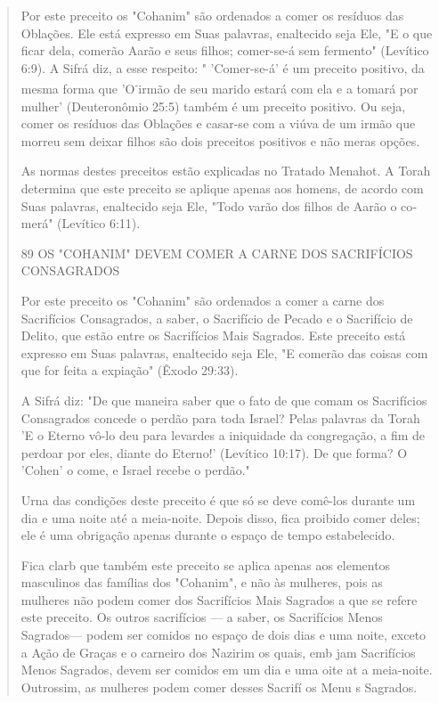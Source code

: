 \begin{quote}
Por este preceito os "Cohanim" são ordenados a comer os resíduos das
Oblações. Ele está expresso em Suas palavras, enaltecido seja Ele, "E o
que ficar dela, comerão Aarão e seus filhos; comer-se-á sem fermento"
(Levítico 6:9). A Sifrá diz, a esse respeito: " 'Comer-se-á' é um
preceito positivo, da mesma forma que 'O\textsuperscript{-}irmão de seu
marido estará com ela e a tomará por mulher' (Deu­teronômio 25:5) também
é um preceito positivo. Ou seja, comer os resíduos das Oblações e
casar-se com a viúva de um irmão que morreu sem deixar filhos são dois
preceitos positivos e não meras opções.

As normas destes preceitos estão explicadas no Tratado Menahot. A Torah
determina que este preceito se aplique apenas aos homens, de acordo com
Suas palavras, enaltecido seja Ele, "Todo varão dos filhos de Aarão o
co­merá" (Levítico 6:11).

89 OS "COHANIM" DEVEM COMER A CARNE DOS SACRIFÍCIOS CONSAGRADOS

Por este preceito os "Cohanim" são ordenados a comer a carne dos
Sacrifícios Consagrados, a saber, o Sacrifício de Pecado e o Sacrifício
de Delito, que estão entre os Sacrifícios Mais Sagrados. Este preceito
está expresso em Suas palavras, enaltecido seja Ele, "E comerão das
coisas com que for feita a expia­ção" (Êxodo 29:33).

A Sifrá diz: "De que maneira saber que o fato de que comam os
Sa­crifícios Consagrados concede o perdão para toda Israel? Pelas
palavras da To­rah 'E o Eterno vô-lo deu para levardes a iniquidade da
congregação, a fim de perdoar por eles, diante do Eterno!' (Levítico
10:17). De que forma? O 'Cohen' o come, e Israel recebe o perdão."

Urna das condições deste preceito é que só se deve comê-los duran­te um
dia e uma noite até a meia-noite. Depois disso, fica proibido comer
de­les; ele é uma obrigação apenas durante o espaço de tempo
estabelecido.

Fica clarb que também este preceito se aplica apenas aos elementos
masculinos das famílias dos "Cohanim", e não às mulheres, pois as
mulheres não podem comer dos Sacrifícios Mais Sagrados a que se refere
este preceito. Os outros sacrifícios --- a saber, os Sacrifícios Menos
Sagrados--- podem ser co­midos no espaço de dois dias e uma noite,
exceto a Ação de Graças e o carnei­ro dos Nazirim os quais, emb jam
Sacrifícios Menos Sagrados, devem ser comidos em um dia e uma oite at a
meia-noite. Outrossim, as mulheres po­dem comer desses Sacrifí os Menu s
Sagrados.


\end{quote}
